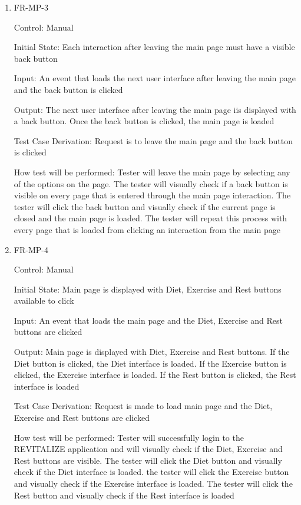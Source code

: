\documentclass[12pt, titlepage]{article}
\begin{document}
\begin{enumerate}
	\item{FR-MP-3\\}
	
	Control: Manual
	
	Initial State: Each interaction after leaving the main page must have a visible back button
	
	Input: An event that loads the next user interface after leaving the main page and the back button is clicked
	
	Output: The next user interface after leaving the main page iis displayed with a back button. Once the back button is clicked, the main page is loaded
	
	Test Case Derivation: Request is to leave the main page and the back button is clicked
	
	How test will be performed: Tester will leave the main page by selecting any of the options on the page. The tester will visually check if a back button is visible on every page that is entered through the main page interaction. The tester will click the back button and visually check if the current page is closed and the main page is loaded. The tester will repeat this process with every page that is  loaded from clicking an interaction from the main page
	
	\item{FR-MP-4\\}
	
	Control: Manual
	
	Initial State: Main page is displayed with Diet, Exercise and Rest buttons available to click
	
	Input: An event that loads the main page and the Diet, Exercise and Rest buttons are clicked
	
	Output: Main page is displayed with Diet, Exercise and Rest buttons. If the Diet button is clicked, the Diet interface is loaded. If the Exercise button is clicked, the Exercise interface is loaded. If the Rest button is clicked, the Rest interface is loaded
	
	Test Case Derivation: Request is made to load main page and the Diet, Exercise and Rest buttons are clicked
	
	How test will be performed: Tester will successfully login to the REVITALIZE application and will visually check if the Diet, Exercise and Rest buttons are visible. The tester will click the Diet button and visually check if the Diet interface is loaded. the tester will click the Exercise button and visually check if the Exercise interface is loaded. The tester will click the Rest button and visually check if the Rest interface is loaded
	
\end{enumerate}
\end{document}
